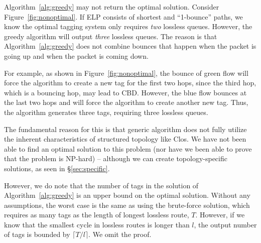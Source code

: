 Algorithm~\ref{alg:greedy} may not return the optimal
solution.  Consider Figure~\ref{fig:nonoptimal}.  If ELP
consists of shortest and ``1-bounce'' paths, we know the optimal tagging system
only requires {\em two} lossless queues. However, the greedy algorithm will
output {\em three} lossless queues. The reason is that
Algorithm~\ref{alg:greedy} does not combine bounces that happen when the packet
is going up and when the packet is coming down.

For example, as shown in Figure~\ref{fig:nonoptimal}, the bounce of green flow
will force the algorithm to create a new tag for the first two hops,
since the third hop, which is a bouncing hop, may lead to CBD.  However, the
blue flow bounces at the last two hops and will force the algorithm to create
another new tag. Thus, the algorithm generates three tags, requiring
three lossless queues.

The fundamental reason for this is that generic algorithm does not fully utilize
the inherent characteristics of structured topology like Clos. We have not been
able to find an optimal solution to this problem (nor have we been able to prove
that the problem is NP-hard) -- although we can create topology-specific
solutions, as seen in \S\ref{sec:specific}. 


However, we do note that the number of tags in the solution of
Algorithm~\ref{alg:greedy} is an upper bound on the optimal solution.  Without
any assumptions, the worst case is the same as using the brute-force solution,
which requires as many tags as the length of longest lossless route, $T$.
However, if we know that the smallest cycle in lossless routes is longer than
$l$, the output number of tags is bounded by $\lceil T/l \rceil$. We omit the
proof.

